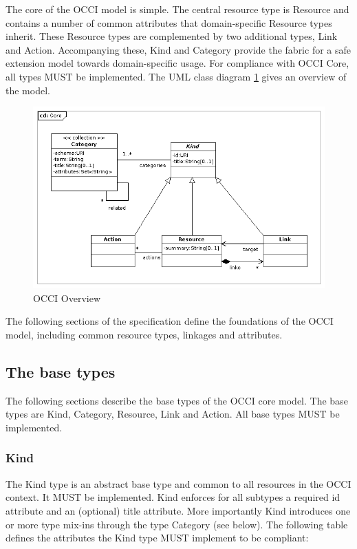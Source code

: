 \documentclass[10pt,a4paper]{article}
\begin{document}
The core of the OCCI model is simple. The central resource type is Resource and contains a number of common attributes that domain-specific Resource types inherit. These Resource types are complemented by two additional types, Link and Action. Accompanying these, Kind and Category provide the fabric for a safe extension model towards domain-specific usage. For compliance with OCCI Core, all types MUST be implemented. The UML class diagram \ref{fig:occi_core} gives an overview of the model.

\clearpage
\begin{figure}[!h]
	\centering
	\includegraphics[scale=0.5]{figs/core_model.png}
	\caption{OCCI Overview}
	\label{fig:occi_core}
\end{figure}

The following sections of the specification define the foundations of the OCCI model, including common resource types, linkages and attributes.

\subsection{The base types}
The following sections describe the base types of the OCCI core model. The base types are Kind, Category, Resource, Link and Action. All base types MUST be implemented.

\subsubsection{Kind}
The Kind type is an abstract base type and common to all resources in the OCCI context. It MUST be implemented. Kind enforces for all subtypes a required id attribute and an (optional) title attribute. More importantly Kind introduces one or more type mix-ins through the type Category (see below). The following table defines the attributes the Kind type MUST implement to be compliant:
\end{document}
